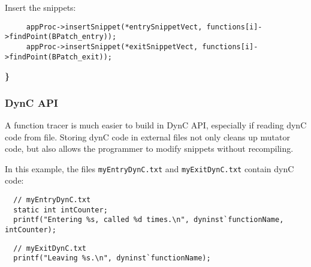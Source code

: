 \documentclass{article}
\begin{document}
Insert the snippets:
\begin{lstlisting}
     appProc->insertSnippet(*entrySnippetVect, functions[i]->findPoint(BPatch_entry));
     appProc->insertSnippet(*exitSnippetVect, functions[i]->findPoint(BPatch_exit));
\end{lstlisting}

\noindent \textbf{\}}

\begin{center} 
\end{center}

\begin{comment}
  // find points
  std::vector<BPatch_point *> *entryPoints = functions[i]->findPoint(BPatch_entry);
  std::vector<BPatch_point *> *exitPoints = functions[i]->findPoint(BPatch_exit);

  // insert snippets
  appProc->insertSnippet(BPatch_sequence(entrySnippetVect), entryPoints);
  appProc->insertSnippet(BPatch_sequence(exitSnippetVect), exitPoints);
}

  // run mutatee
  appProc->continueExecution();
\end{comment}

\pagebreak


\subsubsection{DynC API}

A function tracer is much easier to build in DynC API, especially if reading dynC code from file. Storing dynC code in external files not only cleans up mutator code, but also allows the programmer to modify snippets without recompiling.

\vspace{0.5cm}


\noindent In this example, the files \verb!myEntryDynC.txt! and \verb!myExitDynC.txt! contain dynC code:

\begin{lstlisting}
  // myEntryDynC.txt
  static int intCounter;
  printf("Entering %s, called %d times.\n", dyninst`functionName, intCounter);
\end{lstlisting}

\begin{lstlisting}
  // myExitDynC.txt
  printf("Leaving %s.\n", dyninst`functionName);
\end{lstlisting}
\end{document}
